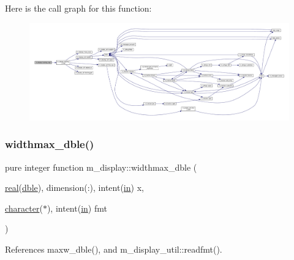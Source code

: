 Here is the call graph for this function\+:
\nopagebreak
\begin{figure}[H]
\begin{center}
\leavevmode
\includegraphics[width=350pt]{namespacem__display_a369e3db088c0732554bd00dac6ce628d_cgraph}
\end{center}
\end{figure}
\mbox{\label{namespacem__display_aed07125464a462f9fa53ed2333846273}} 
\subsubsection{\texorpdfstring{widthmax\+\_\+dble()}{widthmax\_dble()}}
{\footnotesize\ttfamily pure integer function m\+\_\+display\+::widthmax\+\_\+dble (\begin{DoxyParamCaption}\item[{\hyperlink{read__watch_83_8txt_abdb62bde002f38ef75f810d3a905a823}{real}(\hyperlink{namespacem__display_a46d90b75b6ccef7ccade133e5847e815}{dble}), dimension(\+:), intent(\hyperlink{M__journal_83_8txt_afce72651d1eed785a2132bee863b2f38}{in})}]{x,  }\item[{\hyperlink{option__stopwatch_83_8txt_abd4b21fbbd175834027b5224bfe97e66}{character}($\ast$), intent(\hyperlink{M__journal_83_8txt_afce72651d1eed785a2132bee863b2f38}{in})}]{fmt }\end{DoxyParamCaption})\hspace{0.3cm}{\ttfamily [private]}}



References maxw\+\_\+dble(), and m\+\_\+display\+\_\+util\+::readfmt().

